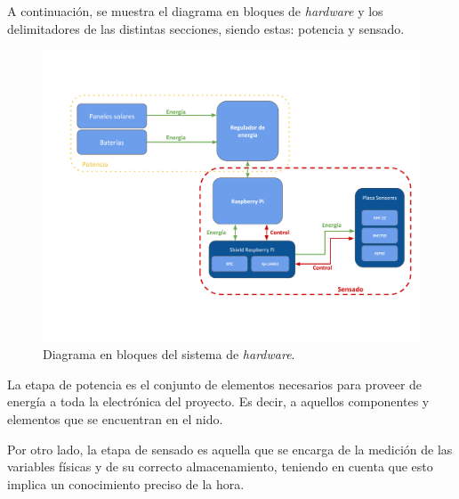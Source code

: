 A continuación, se muestra el diagrama en bloques de \textit{hardware} y los delimitadores de las distintas secciones, siendo estas: potencia y sensado.

\begin{figure}[H]
	\centering
	\includegraphics[width=\textwidth]{ImagenesIngenieria de Detalle/DiagramaHardwareMarcado}		
	\caption{Diagrama en bloques del sistema de \textit{hardware}.}
	\label{fig:diagrama_hardware}
\end{figure}

La etapa de potencia es el conjunto de elementos necesarios para proveer de energía a toda la electrónica del proyecto. Es decir, a aquellos componentes y elementos que se encuentran en el nido.


Por otro lado, la etapa de sensado es aquella que se encarga de la medición de las variables físicas y de su correcto almacenamiento, teniendo en cuenta que esto implica un conocimiento preciso de la hora.
